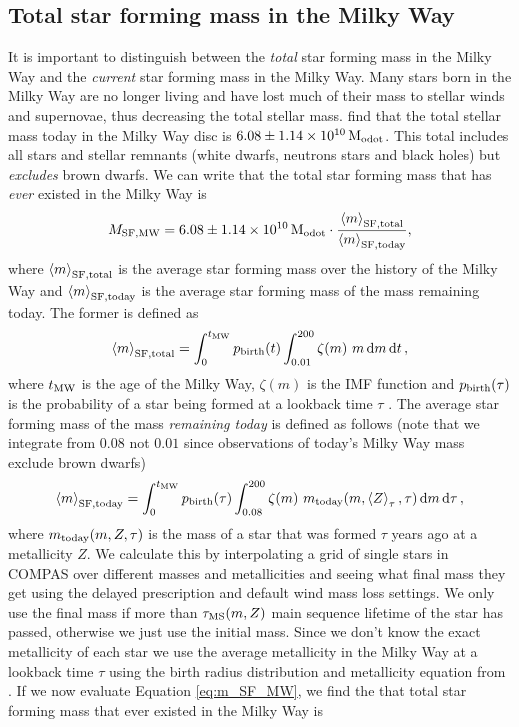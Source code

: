 \subsection{Total star forming mass in the Milky Way}
It is important to distinguish between the \textit{total} star forming mass in the Milky Way and the \textit{current} star forming mass in the Milky Way. Many stars born in the Milky Way are no longer living and have lost much of their mass to stellar winds and supernovae, thus decreasing the total stellar mass. \citet{Licquia+2014} find that the total stellar mass today in the Milky Way disc is $6.08 \pm 1.14 \times 10^{10} \unit{M_{\rm odot}}$. This total includes all stars and stellar remnants (white dwarfs, neutrons stars and black holes) but \textit{excludes} brown dwarfs. We can write that the total star forming mass that has \textit{ever} existed in the Milky Way is
\begin{equation}\label{eq:m_SF_MW}
    M_{\rm SF, MW} = 6.08 \pm 1.14 \times 10^{10} \unit{M_{\rm odot}} \cdot \frac{\avg{m}_{\rm SF, total}}{\avg{m}_{\rm SF, today}},
\end{equation}
where $\left\langle m\right\rangle_{\rm SF, total}$ is the average star forming mass over the history of the Milky Way and $\left\langle m\right\rangle_{\rm SF, today}$ is the average star forming mass of the mass remaining today. The former is defined as
\begin{equation}
    \avg{m}_{\rm SF, total} = \int_{0}^{t_{\rm MW}} p_{\rm birth}(t) \int_{0.01}^{200} \zeta(m)\ m \dd{m} \dd{t},
\end{equation}
where $t_{\rm MW}$ is the age of the Milky Way, $\zeta(m)$ is the \citet{Kroupa+2001} IMF function and $p_{\rm birth}(\tau)$ is the probability of a star being formed at a lookback time $\tau$ \citep[][Eq.\,4]{Frankel+2018}. The average star forming mass of the mass \textit{remaining today} is defined as follows (note that we integrate from $0.08$ not $0.01$ since observations of today's Milky Way mass exclude brown dwarfs)
\begin{equation}
    \avg{m}_{\rm SF, today} = \int_{0}^{t_{\rm MW}} p_{\rm birth}(\tau) \int_{0.08}^{200} \zeta(m)\ m_{\rm today}(m, \avg{Z}_\tau, \tau) \dd{m} \dd{\tau},
\end{equation}
where $m_{\rm today}(m, Z, \tau)$ is the mass of a star that was formed $\tau$ years ago at a metallicity $Z$. We calculate this by interpolating a grid of single stars in COMPAS over different masses and metallicities and seeing what final mass they get using the \citet{Fryer+2012} delayed prescription and default wind mass loss settings. We only use the final mass if more than $\tau_{\rm MS}(m, Z)$ main sequence lifetime of the star has passed, otherwise we just use the initial mass. Since we don't know the exact metallicity of each star we use the average metallicity in the Milky Way at a lookback time $\tau$ using the birth radius distribution and metallicity equation from \citet{Frankel+2018}. If we now evaluate Equation \ref{eq:m_SF_MW}, we find the that total star forming mass that ever existed in the Milky Way is
